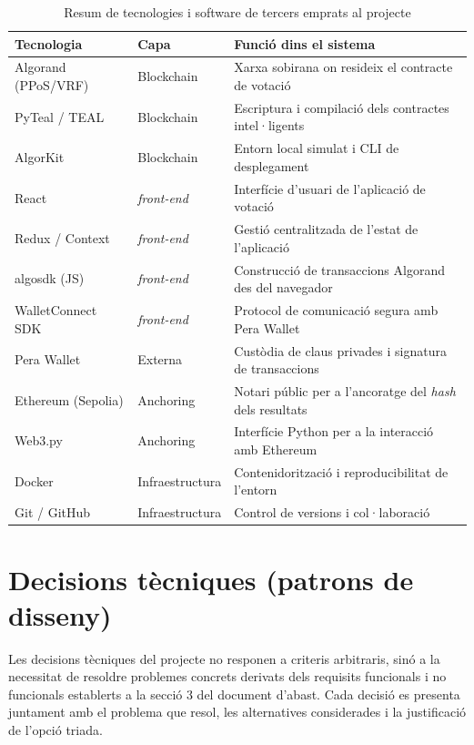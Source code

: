 \begin{table}[H]
\centering
\small
\begin{tabularx}{\textwidth}{l l X}
\toprule
\textbf{Tecnologia} & \textbf{Capa} & \textbf{Funció dins el sistema} \\
\midrule
Algorand (PPoS/VRF) & Blockchain & Xarxa sobirana on resideix el contracte de votació \\
PyTeal / TEAL & Blockchain & Escriptura i compilació dels contractes intel·ligents \\
AlgorKit & Blockchain & Entorn local simulat i CLI de desplegament \\
React & \textit{front-end} & Interfície d'usuari de l'aplicació de votació \\
Redux / Context & \textit{front-end} & Gestió centralitzada de l'estat de l'aplicació \\
algosdk (JS) & \textit{front-end} & Construcció de transaccions Algorand des del navegador \\
WalletConnect SDK & \textit{front-end} & Protocol de comunicació segura amb Pera Wallet \\
Pera Wallet & Externa & Custòdia de claus privades i signatura de transaccions \\
Ethereum (Sepolia) & Anchoring & Notari públic per a l'ancoratge del \textit{hash} dels resultats \\
Web3.py & Anchoring & Interfície Python per a la interacció amb Ethereum \\
Docker & Infraestructura & Contenidorització i reproducibilitat de l'entorn \\
Git / GitHub & Infraestructura & Control de versions i col·laboració \\
\bottomrule
\end{tabularx}
\caption{Resum de tecnologies i software de tercers emprats al projecte}
\label{tab:tecnologies}
\end{table}
 
 
\section{Decisions tècniques (patrons de disseny)}
 
Les decisions tècniques del projecte no responen a criteris arbitraris, sinó a la necessitat de resoldre problemes concrets derivats dels requisits funcionals i no funcionals establerts a la secció 3 del document d'abast. Cada decisió es presenta juntament amb el problema que resol, les alternatives considerades i la justificació de l'opció triada.
 
